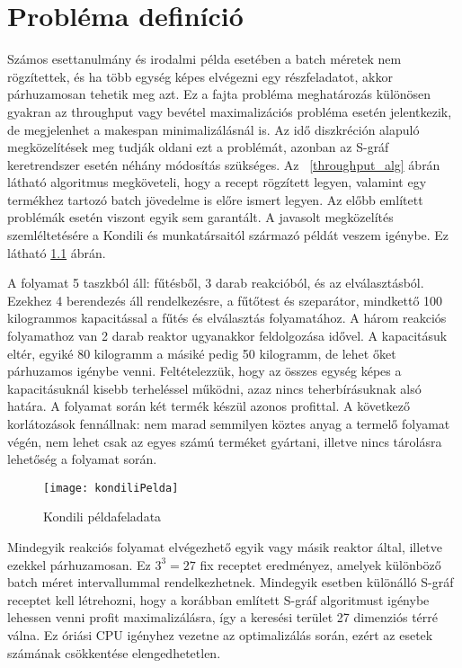 \chapter{Probléma definíció}
Számos esettanulmány és irodalmi példa esetében a batch méretek nem rögzítettek, és ha több egység képes elvégezni egy részfeladatot, akkor párhuzamosan tehetik meg azt. Ez a fajta probléma meghatározás különösen gyakran az throughput vagy bevétel maximalizációs probléma esetén jelentkezik, de megjelenhet a makespan minimalizálásnál is. Az idő diszkréción alapuló megközelítések meg tudják oldani ezt a problémát, azonban az S-gráf keretrendszer esetén néhány módosítás szükséges.
Az ~\ref{throughput_alg} ábrán látható algoritmus megköveteli, hogy a recept rögzített legyen, valamint egy termékhez tartozó batch jövedelme is előre ismert legyen. Az előbb említett problémák esetén viszont egyik sem garantált. 
A javasolt megközelítés szemléltetésére a Kondili és munkatársaitól \cite{kondili} származó példát veszem igénybe. Ez látható \ref{kondiliPelda} ábrán.

A folyamat 5 taszkból áll: fűtésből, 3 darab reakcióból, és az elválasztásból. Ezekhez 4 berendezés áll rendelkezésre, a fűtőtest és szeparátor, mindkettő 100 kilogrammos kapacitással a fűtés és elválasztás folyamatához. A három reakciós folyamathoz van 2 darab reaktor ugyanakkor feldolgozása idővel. A kapacitásuk eltér, egyiké 80 kilogramm a másiké pedig 50 kilogramm, de lehet őket párhuzamos igénybe venni. Feltételezzük, hogy az összes egység képes a kapacitásuknál kisebb terheléssel működni, azaz nincs teherbírásuknak alsó határa. A folyamat során két termék készül azonos profittal. A következő korlátozások fennállnak: nem marad semmilyen köztes anyag a termelő folyamat végén, nem lehet csak az egyes számú terméket gyártani, illetve nincs tárolásra lehetőség a folyamat során.
\begin{figure}[H]
\begin{center}
\texttt{[image: kondiliPelda]}
\caption{Kondili példafeladata}
\label{kondiliPelda}
\end{center}
\end{figure}
Mindegyik reakciós folyamat elvégezhető egyik vagy másik reaktor által, illetve ezekkel párhuzamosan. Ez $3^3 = 27$ fix receptet eredményez, amelyek különböző batch méret intervallummal rendelkezhetnek. Mindegyik esetben különálló S-gráf receptet kell létrehozni, hogy a korábban említett S-gráf algoritmust igénybe lehessen venni profit maximalizálásra, így a keresési terület 27 dimenziós térré válna. Ez óriási CPU igényhez vezetne az optimalizálás során, ezért az esetek számának csökkentése elengedhetetlen.

